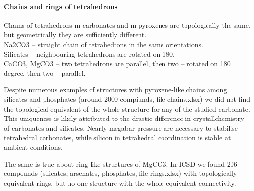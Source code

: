 \documentclass[a4paperm]{article}
\begin{document}
	\paragraph{Chains and rings of tetrahedrons} 
Chains of tetrahedrons in carbonates and in pyroxenes are topologically the same, but geometrically they are sufficiently different. \\
Na2CO3 – straight chain of tetrahedrons in the same orientations. \\
Silicates – neighbouring tetrahedrons are rotated on 180. \\
CaCO3, MgCO3 – two tetrahedrons are parallel, then two – rotated on 180 degree, then two – parallel. 
\par Despite numerous examples of structures with pyroxene-like chains among silicates and phosphates (around 2000 compiunds, file chains.xlsx)  we did not find the topological equivalent of the whole structure for any of the studied carbonate. This uniqueness is likely attributed to the drastic difference in crystallchemistry of carbonates and silicates. Nearly megabar pressure are necessary to stabilise tetrahedral carbonates, while silicon in tetrahedral coordination is stable at ambient conditions.
\par The same is true about ring-like structures of MgCO3. In ICSD we found 206 compounds (silicates, arsenates, phosphates, file rings.xlsx) with topologically equivalent rings, but no one structure with the whole equivalent connectivity.
\end{document}
